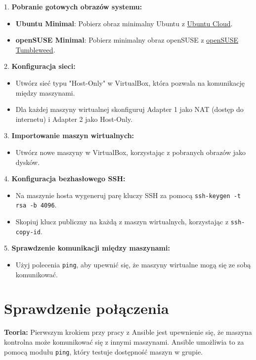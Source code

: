 \documentclass{article}
\begin{document}
1. \textbf{Pobranie gotowych obrazów systemu:}
   \begin{itemize}
       \item \textbf{Ubuntu Minimal}: Pobierz obraz minimalny Ubuntu z \href{https://cloud-images.ubuntu.com/}{Ubuntu Cloud}.
       \item \textbf{openSUSE Minimal}: Pobierz minimalny obraz openSUSE z \href{https://get.opensuse.org/tumbleweed/}{openSUSE Tumbleweed}.
   \end{itemize}

2. \textbf{Konfiguracja sieci:}
   \begin{itemize}
       \item Utwórz sieć typu "Host-Only" w VirtualBox, która pozwala na komunikację między maszynami.
       \item Dla każdej maszyny wirtualnej skonfiguruj Adapter 1 jako NAT (dostęp do internetu) i Adapter 2 jako Host-Only.
   \end{itemize}

3. \textbf{Importowanie maszyn wirtualnych:}
   \begin{itemize}
       \item Utwórz nowe maszyny w VirtualBox, korzystając z pobranych obrazów jako dysków.
   \end{itemize}

4. \textbf{Konfiguracja bezhasłowego SSH:}
   \begin{itemize}
       \item Na maszynie hosta wygeneruj parę kluczy SSH za pomocą \texttt{ssh-keygen -t rsa -b 4096}.
       \item Skopiuj klucz publiczny na każdą z maszyn wirtualnych, korzystając z \texttt{ssh-copy-id}.
   \end{itemize}

5. \textbf{Sprawdzenie komunikacji między maszynami:}
   \begin{itemize}
       \item Użyj polecenia \texttt{ping}, aby upewnić się, że maszyny wirtualne mogą się ze sobą komunikować.
   \end{itemize}

\section{Sprawdzenie połączenia}

\textbf{Teoria:}  
Pierwszym krokiem przy pracy z Ansible jest upewnienie się, że maszyna kontrolna może komunikować się z innymi maszynami. Ansible umożliwia to za pomocą modułu \texttt{ping}, który testuje dostępność maszyn w grupie.
\end{document}
